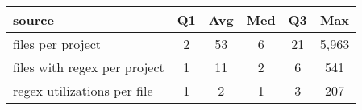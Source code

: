 \begin{center}
\begin{tabular}{l|ccccc}
\toprule
source & Q1 & Avg & Med & Q3 & Max \\ 
\midrule
files per project & 2 & 53 & 6 & 21 & 5,963 \\ 
\midrule
files with regex per project & 1 & 11 & 2 & 6 & 541 \\ 
\midrule
regex utilizations per file & 1 & 2 & 1 & 3 & 207 \\ 
\bottomrule
\end{tabular}
\end{center}
